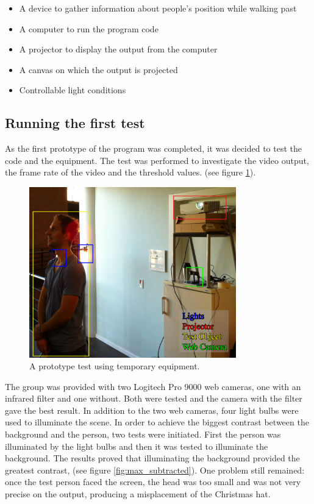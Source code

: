 
\begin{itemize}
\item A device to gather information about people's position while walking past
\item A computer to run the program code
\item A projector to display the output from the computer
\item A canvas on which the output is projected
\item Controllable light conditions
\end{itemize}

\subsection{Running the first test}
As the first prototype of the program was completed, it was decided to test the code and the  equipment. The test was performed to investigate the video output, the frame rate of the video and the threshold values. (see figure \ref{fig:ir_cam_test}).

\begin{figure}[htbp]
\centering
\includegraphics[width=0.80\textwidth]{Pictures/Test/TestSetup.jpg}
\caption{A prototype test using temporary equipment.}
\label{fig:ir_cam_test}
\end{figure} 

The group was provided with two Logitech Pro 9000 web cameras, one with an infrared filter and one without. Both were tested and the camera with the filter gave the best result. In addition to the two web cameras, four light bulbs were used to illuminate the scene. In order to achieve the biggest contrast between the background and the person, two tests were initiated. First the person was illuminated by the light bulbs and then it was tested to illuminate the background. The results proved that illuminating the background provided the greatest contrast, (see figure \ref{fig:max_subtracted}). One problem still remained: once the test person faced the screen, the head was too small and was not very precise on the output, producing a misplacement of the Christmas hat.

